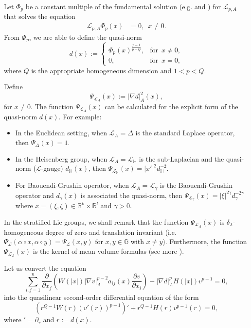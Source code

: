 \documentclass[a4paper,12pt,reqno]{amsart}
\theoremstyle{theorem}
\numberwithin{equation}{section}
\theoremstyle{plain}
\theoremstyle{definition}
\theoremstyle{defi}
\begin{document}
Let $\Phi_p$ be a constant multiple of the fundamental solution (e.g. \cite{BG89} and \cite{KM92}) for $\mathcal{L}_{p,A}$ that solves the equation 
\begin{align*}
\mathcal{L}_{p,A} \Phi_p(x) &= 0, \,\,\, x \neq 0.
\end{align*}
From $\Phi_p$, we are able to define the quasi-norm
\begin{equation}\label{quasi-norm}
d(x) := \left\{\begin{matrix}
\Phi_p(x)^{\frac{p-1}{p-Q}}, & \text{for} \,\,\, x \neq 0,\\ 
0,& \text{for} \,\,\, x = 0,
\end{matrix}\right.
\end{equation}
where $Q$ is the appropriate homogeneous dimension and $1<p<Q$. 

Define 
\begin{equation}
\Psi_{\mathcal{L}_A}(x) := |\nabla d|^2_A(x),
\end{equation}
for $x \neq 0$. The function $\Psi_{\mathcal{L}_A}(x)$ can be calculated for the explicit form of the quasi-norm $d(x)$. For example:  
\begin{itemize}
	\item In the Euclidean setting, when $\mathcal{L}_A= \Delta$ is the standard Laplace operator, then $\Psi_{\Delta}(x) =1$.
	\item In the Heisenberg group, when $\mathcal{L}_A= \mathcal{L}_{\mathbb{H}}$ is the sub-Laplacian and the quasi-norm ($\mathcal{L}$-gauge) $d_{\mathbb{H}}(x)$, then $\Psi_{\mathcal{L}_{\mathbb{H}}}(x) = |x'|^2d_{\mathbb{H}}^{-2}$.
	\item For Baouendi-Grushin operator, when $\mathcal{L}_A= \mathcal{L}_{\gamma}$ is the Baouendi-Grushin operator and $d_{\gamma}(x)$ is associated the quasi-norm, then $\Psi_{\mathcal{L}_{\gamma}}(x) =|\xi|^{2\gamma}d_{\gamma}^{-2\gamma}$ where $x = (\xi,\zeta) \in \mathbb{R}^k\times \mathbb{R}^l$ and $\gamma>0$.
\end{itemize}
In the stratified Lie groups, we shall remark that the function $\Psi_{\mathcal{L}_A}(x)$ is $\delta_{\lambda}$-homogeneous degree of zero and translation invariant (i.e. $\Psi_{\mathcal{L}}(\alpha \circ x, \alpha \circ y)= \Psi_{\mathcal{L}}(x,y)$ for $x,y \in \mathbb{G}$ with $x\neq y$). Furthermore, the function $\Psi_{\mathcal{L}_A}(x)$ is the kernel of mean volume formulas (see more \cite[Definition 5.5.1]{BLU07}).  

Let us convert the equation
\begin{equation}\label{eq-PDE}
\sum_{i,j=1}^n \frac{\partial }{\partial x_j} \left( W(|x|) |\nabla v|^{p-2}_A a_{ij}(x) \frac{\partial v}{\partial x_i} \right) + |\nabla d|^p_AH(|x|) v^{p-1} =0,
\end{equation}
into the quasilinear second-order differential equation of the form
\begin{equation}\label{eq-ODE}
( r^{Q-1} W(r) (v'(r))^{p-1})' + r^{Q-1}H(r) v^{p-1}(r) =0,
\end{equation}
where $' = \partial_{r}$ and $r:=d(x)$.
\end{document}

